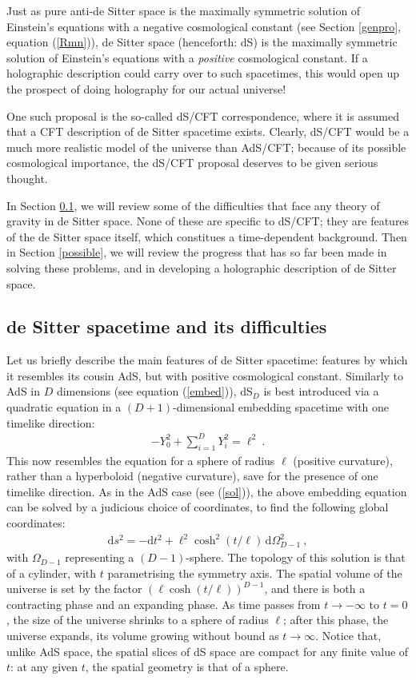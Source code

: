 \documentclass[12pt]{article}
\def\dd{\mbox{d}}
\def\O{\Omega}
\renewcommand{\^}[1]{\hat{#1}}
\newcommand{\bea}{\begin{eqnarray}}
\newcommand{\eea}{\end{eqnarray}}
\newcommand{\eq}[1]{(\ref{#1})}
\begin{document}
Just as pure anti-de Sitter space is the maximally symmetric solution of Einstein's equations with a negative cosmological constant (see Section \ref{genpro}, equation \eq{Rmn}), de Sitter space (henceforth: dS) is the maximally symmetric solution of Einstein's equations with a {\it positive} cosmological constant. If a holographic description could carry over to such spacetimes, this would open up the prospect of doing holography for our actual universe! 

One such proposal is the so-called dS/CFT correspondence, where it is assumed that a CFT description of de Sitter spacetime exists. Clearly, dS/CFT would be a much more realistic model of the universe than AdS/CFT; because of its possible cosmological importance, the dS/CFT proposal deserves to be given serious thought.

In Section \ref{difficult}, we will review some of the difficulties that face any theory of gravity in de Sitter space. None of these are specific to dS/CFT; they are  features of the de Sitter space itself, which constitues a time-dependent background. Then in Section \ref{possible}, we will review the progress that has so far been made in solving  these problems, and in developing a holographic description of de Sitter space. 

\subsection{de Sitter spacetime and its difficulties}\label{difficult}

Let us briefly describe the main features of de Sitter spacetime: features by which it resembles its cousin AdS, but with positive cosmological constant. Similarly to AdS in $D$ dimensions (see equation \eq{embed}), dS$_D$ is best introduced via a quadratic equation in a $(D+1)$-dimensional embedding spacetime with one timelike direction:
\bea
-Y_0^2+\sum_{i=1}^DY_i^2=\ell^2~.
\eea
This now resembles the equation for a sphere of radius $\ell$ (positive curvature), rather than a hyperboloid (negative curvature), save for the presence of one timelike direction. 
As in the AdS case (see \eq{sol}), the above embedding equation can be solved by a judicious choice of coordinates, to find the following global coordinates:
\bea
\dd s^2=-\dd t^2+\ell^2\cosh^2(t/\ell)\,\dd\O_{D-1}^2~,
\eea
with $\O_{D-1}$ representing a $(D-1)$-sphere. The topology of this solution is that of a cylinder, with $t$ parametrising the symmetry axis. The spatial volume of the universe is set by the factor $\left(\ell\cosh(t/\ell)\right)^{D-1}$, and there is both a contracting phase and an expanding phase. As time passes from $t\rightarrow-\infty$ to $t=0$, the size of the universe shrinks to a sphere of radius $\ell$; after this phase, the universe expands, its volume growing without bound as $t\rightarrow\infty$. Notice that, unlike AdS space, the spatial slices of dS space are compact for any finite value of $t$: at any given $t$, the spatial geometry is that of a sphere. 
\end{document}
